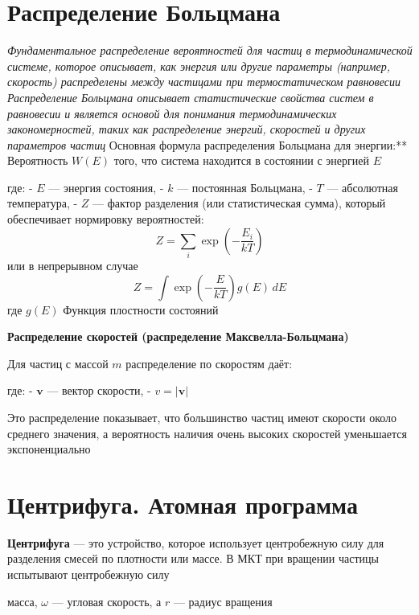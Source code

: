 \documentclass[14pt]{article}
\begin{document}
\section{Распределение Больцмана}
\textit{Фундаментальное распределение вероятностей для частиц в термодинамической системе, которое описывает, как энергия или другие параметры (например, скорость) распределены между частицами при термостатическом равновесии}
\textit{Распределение Больцмана описывает статистические свойства систем в равновесии и является основой для понимания термодинамических закономерностей, таких как распределение энергий, скоростей и других параметров частиц}
\newline Основная формула распределения Больцмана для энергии:** Вероятность \(W(E)\) того, что система находится в состоянии с энергией \(E\)
\begin{center}
    \big[\[ W(E) = \frac{1}{Z} \exp\left( - \frac{E}{k T} \right) \]\big]
    \newline где: - \(E\) — энергия состояния, - \(k\) — постоянная Больцмана, - \(T\) — абсолютная температура, - \(Z\) — фактор разделения (или статистическая сумма), который обеспечивает нормировку вероятностей:
    \[ Z = \sum_{i} \exp \left( - \frac{E_i}{k T} \right) \] 
    \newline или в непрерывном случае
    \[ Z = \int \exp \left( - \frac{E}{k T} \right) g(E) \, dE \] где \(g(E)\)
    \newline Функция плостности состояний
\end{center}

\textbf{Распределение скоростей (распределение Максвелла-Больцмана)}

Для частиц с массой \(m\) распределение по скоростям даёт:
\begin{center}
    \big[\[ f(\mathbf{v}) = \left( \frac{m}{2 \pi k T} \right)^{3/2} \exp \left( - \frac{m v^2}{2 k T} \right) \]\big]
    \newline где: - \(\mathbf{v}\) — вектор скорости, - \(v = |\mathbf{v}|\)
\end{center}

Это распределение показывает, что большинство частиц имеют скорости около среднего значения, а вероятность наличия очень высоких скоростей уменьшается экспоненциально



\section{Центрифуга. Атомная программа}
\textbf{Центрифуга}
\newline — это устройство, которое использует центробежную силу для разделения смесей по плотности или массе. В МКТ при вращении частицы испытывают центробежную силу
\begin{center}
    \big[\(F_c = m \omega^2 r\), где \(m\)\big]
    масса, \(\omega\) — угловая скорость, а \(r\) — радиус вращения
\end{center}
\end{document}
